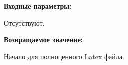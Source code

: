 \textbf{Входные параметры:}

Отсутствуют.

\textbf{Возвращаемое значение:}

Начало для полноценного Latex файла.